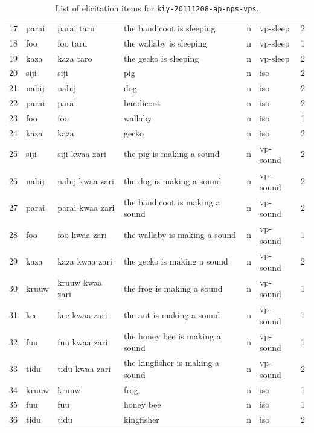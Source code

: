 \documentclass[12pt]{article}
\begin{document}
\begin{table}[!h]
{\begin{tabular}{lllllll}
    17   & parai  & parai taru      & the bandicoot is sleeping        & n         & vp-sleep   & 2        \\
    18   & foo    & foo taru        & the wallaby is sleeping          & n         & vp-sleep   & 1        \\
    19   & kaza   & kaza taro       & the gecko is sleeping            & n         & vp-sleep   & 2        \\
    20   & siji   & siji            & pig                              & n         & iso        & 2        \\
    21   & nabij  & nabij           & dog                              & n         & iso        & 2        \\
    22   & parai  & parai           & bandicoot                        & n         & iso        & 2        \\
    23   & foo    & foo             & wallaby                          & n         & iso        & 1        \\
    24   & kaza   & kaza            & gecko                            & n         & iso        & 2        \\
    25   & siji   & siji kwaa zari  & the pig is making a sound        & n         & vp-sound   & 2        \\
    26   & nabij  & nabij kwaa zari & the dog is making a sound        & n         & vp-sound   & 2        \\
    27   & parai  & parai kwaa zari & the bandicoot is making a sound  & n         & vp-sound   & 2        \\
    28   & foo    & foo kwaa zari   & the wallaby is making a sound    & n         & vp-sound   & 1        \\
    29   & kaza   & kaza kwaa zari  & the gecko is making a sound      & n         & vp-sound   & 2        \\
    30   & kruuw  & kruuw kwaa zari & the frog is making a sound       & n         & vp-sound   & 1        \\
    31   & kee    & kee kwaa zari   & the ant is making a sound        & n         & vp-sound   & 1        \\
    32   & fuu    & fuu kwaa zari   & the honey bee is making a sound  & n         & vp-sound   & 1        \\
    33   & tidu   & tidu kwaa zari  & the kingfisher is making a sound & n         & vp-sound   & 2        \\
    34   & kruuw  & kruuw           & frog                             & n         & iso        & 1        \\
    35   & fuu    & fuu             & honey bee                        & n         & iso        & 1        \\
    36   & tidu   & tidu            & kingfisher                       & n         & iso        & 2        \\
    \end{tabular}}
\label{tab:kiy-20111208}
\caption{List of elicitation items for \texttt{kiy-20111208-ap-nps-vps}.}
\end{table}
\end{document}
